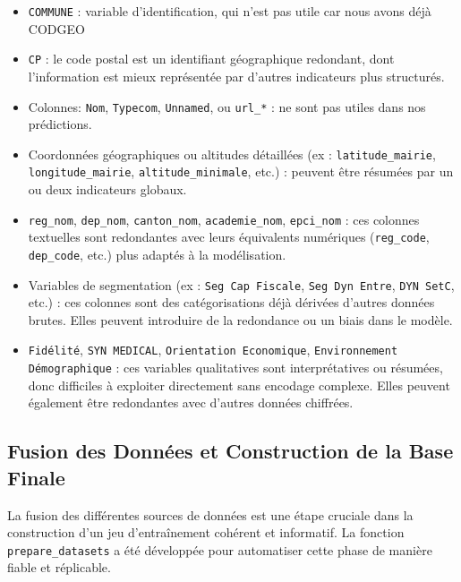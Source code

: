 \begin{itemize}
    \item \texttt{COMMUNE} : variable d’identification, qui n'est pas utile car nous avons déjà CODGEO

    \item \texttt{CP} : le code postal est un identifiant géographique redondant, dont l’information est mieux représentée par d'autres indicateurs plus structurés.

    \item Colonnes: \texttt{Nom}, \texttt{Typecom}, \texttt{Unnamed}, ou \texttt{url\_*} : ne sont pas utiles dans nos prédictions.

    \item Coordonnées géographiques ou altitudes détaillées (ex : \texttt{latitude\_mairie}, \texttt{longitude\_mairie}, \texttt{altitude\_minimale}, etc.) : peuvent être résumées par un ou deux indicateurs globaux.

    \item \texttt{reg\_nom}, \texttt{dep\_nom}, \texttt{canton\_nom}, \texttt{academie\_nom}, \texttt{epci\_nom} : ces colonnes textuelles sont redondantes avec leurs équivalents numériques (\texttt{reg\_code}, \texttt{dep\_code}, etc.) plus adaptés à la modélisation.

    \item Variables de segmentation (ex : \texttt{Seg Cap Fiscale}, \texttt{Seg Dyn Entre}, \texttt{DYN SetC}, etc.) : ces colonnes sont des catégorisations déjà dérivées d'autres données brutes. Elles peuvent introduire de la redondance ou un biais dans le modèle.

    \item \texttt{Fidélité}, \texttt{SYN MEDICAL}, \texttt{Orientation Economique}, \texttt{Environnement Démographique} : ces variables qualitatives sont interprétatives ou résumées, donc difficiles à exploiter directement sans encodage complexe. Elles peuvent également être redondantes avec d'autres données chiffrées.
\end{itemize}
\subsection{Fusion des Données et Construction de la Base Finale}

La fusion des différentes sources de données est une étape cruciale dans la construction d’un jeu d’entraînement cohérent et informatif. La fonction \texttt{prepare\_datasets} a été développée pour automatiser cette phase de manière fiable et réplicable.

